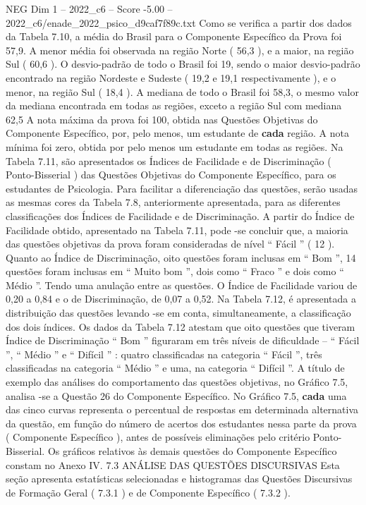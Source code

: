 \begin{textsample}{NEG Dim 1 – 2022\_c6 – Score -5.00 – 2022\_c6/enade\_2022\_psico\_d9caf7f89c.txt}
Como se verifica a partir dos dados da Tabela 7.10, a média do Brasil para o Componente Específico da Prova foi 57,9.
A menor média foi observada na região Norte ( 56,3 ), e a maior, na região Sul ( 60,6 ).
O desvio-padrão de todo o Brasil foi 19, sendo o maior desvio-padrão encontrado na região Nordeste e Sudeste ( 19,2 e 19,1 respectivamente ), e o menor, na região Sul ( 18,4 ).
A mediana de todo o Brasil foi 58,3, o mesmo valor da mediana encontrada em todas as regiões, exceto a região Sul com mediana 62,5 A nota máxima da prova foi 100, obtida nas Questões Objetivas do Componente Específico, por, pelo menos, um estudante de \textbf{cada} região.
A nota mínima foi zero, obtida por pelo menos um estudante em todas as regiões.
Na Tabela 7.11, são apresentados os Índices de Facilidade e de Discriminação ( Ponto-Bisserial ) das Questões Objetivas do Componente Específico, para os estudantes de Psicologia.
Para facilitar a diferenciação das questões, serão usadas as mesmas cores da Tabela 7.8, anteriormente apresentada, para as diferentes classificações dos Índices de Facilidade e de Discriminação.
A partir do Índice de Facilidade obtido, apresentado na Tabela 7.11, pode -se concluir que, a maioria das questões objetivas da prova foram consideradas de nível “ Fácil ” ( 12 ).
Quanto ao Índice de Discriminação, oito questões foram inclusas em “ Bom ”, 14 questões foram inclusas em “ Muito bom ”, dois como “ Fraco ” e dois como “ Médio ”.
Tendo uma anulação entre as questões.
O Índice de Facilidade variou de 0,20 a 0,84 e o de Discriminação, de 0,07 a 0,52.
Na Tabela 7.12, é apresentada a distribuição das questões levando -se em conta, simultaneamente, a classificação dos dois índices.
Os dados da Tabela 7.12 atestam que oito questões que tiveram Índice de Discriminação “ Bom ” figuraram em três níveis de dificuldade – “ Fácil ”, “ Médio ” e “ Difícil ” : quatro classificadas na categoria “ Fácil ”, três classificadas na categoria “ Médio ” e uma, na categoria “ Difícil ”.
A título de exemplo das análises do comportamento das questões objetivas, no Gráfico 7.5, analisa -se a Questão 26 do Componente Específico.
No Gráfico 7.5, \textbf{cada} uma das cinco curvas representa o percentual de respostas em determinada alternativa da questão, em função do número de acertos dos estudantes nessa parte da prova ( Componente Específico ), antes de possíveis eliminações pelo critério Ponto-Bisserial.
Os gráficos relativos às demais questões do Componente Específico constam no Anexo IV. 7.3 ANÁLISE DAS QUESTÕES DISCURSIVAS Esta seção apresenta estatísticas selecionadas e histogramas das Questões Discursivas de Formação Geral ( 7.3.1 ) e de Componente Específico ( 7.3.2 ).

\end{textsample}
